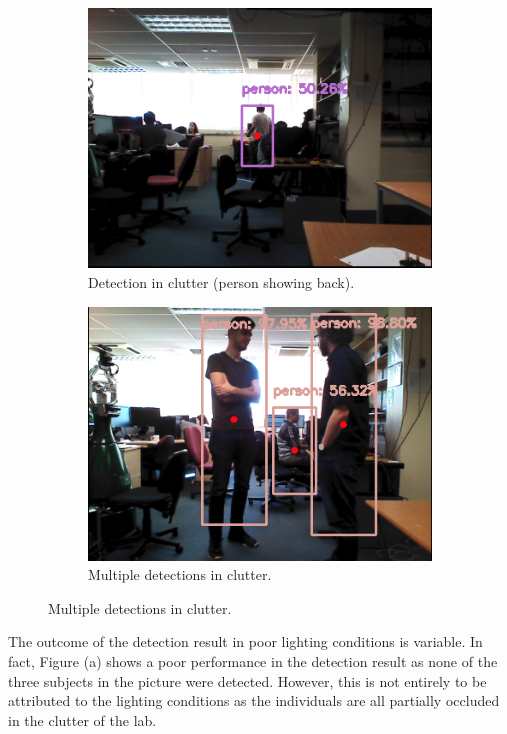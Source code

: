 \begin{figure}[H]
\begin{subfigure}{.5\textwidth}
        \includegraphics[width=.9\linewidth]{images/chapter6_clutter_light_detection_back.png}
        \caption{Detection in clutter (person showing back).}
	\end{subfigure}
    \begin{subfigure}{.5\textwidth}
        \centering
        \includegraphics[width=.9\linewidth]{images/chapter6_clutter_standing.png}
        \caption{Multiple detections in clutter.}
	\end{subfigure}
\end{figure}

The outcome of the detection result in poor lighting conditions is variable. In fact, Figure (a) shows a poor performance in the detection result as none of the three subjects in the picture were detected. However, this is not entirely to be attributed to the lighting conditions as the individuals are all partially occluded in the clutter of the lab.

